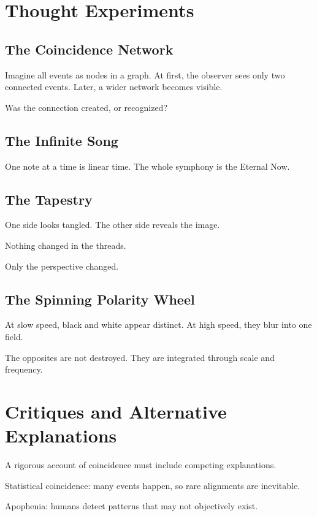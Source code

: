 \section{Thought Experiments}

\subsection{The Coincidence Network}

Imagine all events as nodes in a graph. At first, the observer sees only two connected events. Later, a wider network becomes visible.

Was the connection created, or recognized?

\subsection{The Infinite Song}

One note at a time is linear time. The whole symphony is the Eternal Now.

\subsection{The Tapestry}

One side looks tangled. The other side reveals the image.

Nothing changed in the threads.

Only the perspective changed.

\subsection{The Spinning Polarity Wheel}

At slow speed, black and white appear distinct. At high speed, they blur into one field.

The opposites are not destroyed. They are integrated through scale and frequency.

\section{Critiques and Alternative Explanations}

A rigorous account of coincidence must include competing explanations.

Statistical coincidence: many events happen, so rare alignments are inevitable.

Apophenia: humans detect patterns that may not objectively exist.

